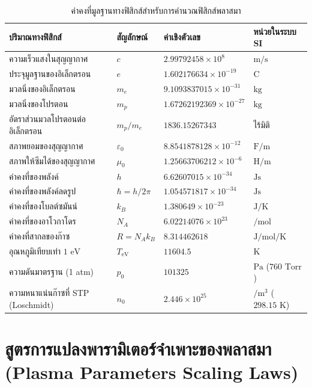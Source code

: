 \begin{table}[H]
\centering
\caption{ค่าคงที่มูลฐานทางฟิสิกส์สำหรับการคำนวณฟิสิกส์พลาสมา}
\label{tab:app_constants}
\begin{tabularx}{\textwidth}{l l l X}
\toprule
\textbf{ปริมาณทางฟิสิกส์} & \textbf{สัญลักษณ์} & \textbf{ค่าเชิงตัวเลข} & \textbf{หน่วยในระบบ SI} \\
\midrule
ความเร็วแสงในสุญญากาศ & $c$ & $2.99792458 \times 10^8$ & $\si{\meter\per\second}$ \\
ประจุมูลฐานของอิเล็กตรอน & $e$ & $1.602176634 \times 10^{-19}$ & $\si{\coulomb}$ \\
มวลนิ่งของอิเล็กตรอน & $m_e$ & $9.1093837015 \times 10^{-31}$ & $\si{\kilogram}$ \\
มวลนิ่งของโปรตอน & $m_p$ & $1.67262192369 \times 10^{-27}$ & $\si{\kilogram}$ \\
อัตราส่วนมวลโปรตอนต่ออิเล็กตรอน & $m_p/m_e$ & $1836.15267343$ & ไร้มิติ \\
สภาพยอมของสุญญากาศ & $\varepsilon_0$ & $8.8541878128 \times 10^{-12}$ & $\si{\farad\per\meter}$ \\
สภาพให้ซึมได้ของสุญญากาศ & $\mu_0$ & $1.25663706212 \times 10^{-6}$ & $\si{\henry\per\meter}$ \\
ค่าคงที่ของพลังค์ & $h$ & $6.62607015 \times 10^{-34}$ & $\si{\joule\second}$ \\
ค่าคงที่ของพลังค์ลดรูป & $\hbar = h/2\pi$ & $1.054571817 \times 10^{-34}$ & $\si{\joule\second}$ \\
ค่าคงที่ของโบลต์ซมันน์ & $k_B$ & $1.380649 \times 10^{-23}$ & $\si{\joule\per\kelvin}$ \\
ค่าคงที่ของอาโวกาโดร & $N_A$ & $6.02214076 \times 10^{23}$ & $\si{\per\mole}$ \\
ค่าคงที่สากลของก๊าซ & $R = N_A k_B$ & $8.314462618$ & $\si{\joule\per\mole\per\kelvin}$ \\
อุณหภูมิเทียบเท่า $1\text{ eV}$ & $T_{\text{eV}}$ & $11604.5$ & $\si{\kelvin}$ \\
ความดันมาตรฐาน (1 atm) & $p_0$ & $101325$ & $\si{\pascal}$ ($760\text{ Torr}$) \\
ความหนาแน่นก๊าซที่ STP (Loschmidt) & $n_0$ & $2.446 \times 10^{25}$ & $\si{\per\meter\cubed}$ ($298.15\text{ K}$) \\
\bottomrule
\end{tabularx}
\end{table}

\section{สูตรการแปลงพารามิเตอร์จำเพาะของพลาสมา (Plasma Parameters Scaling Laws)}
\label{app:sec_plasma_formulas}

